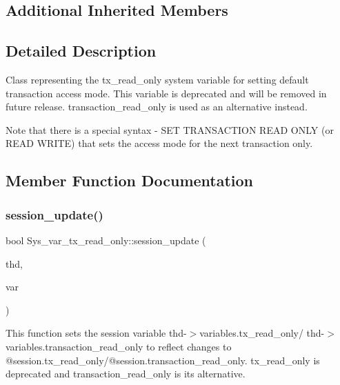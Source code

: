 \subsection*{Additional Inherited Members}


\subsection{Detailed Description}
Class representing the tx\+\_\+read\+\_\+only system variable for setting default transaction access mode. This variable is deprecated and will be removed in future release. \textquotesingle{}transaction\+\_\+read\+\_\+only\textquotesingle{} is used as an alternative instead.

Note that there is a special syntax -\/ S\+ET T\+R\+A\+N\+S\+A\+C\+T\+I\+ON R\+E\+AD O\+N\+LY (or R\+E\+AD W\+R\+I\+TE) that sets the access mode for the next transaction only. 

\subsection{Member Function Documentation}
\mbox{\label{classSys__var__tx__read__only_a449265a5bbe337c98f35529132f9482b}} 
\subsubsection{\texorpdfstring{session\+\_\+update()}{session\_update()}}
{\footnotesize\ttfamily bool Sys\+\_\+var\+\_\+tx\+\_\+read\+\_\+only\+::session\+\_\+update (\begin{DoxyParamCaption}\item[{T\+HD $\ast$}]{thd,  }\item[{\mbox{\hyperlink{classset__var}{set\+\_\+var}} $\ast$}]{var }\end{DoxyParamCaption})\hspace{0.3cm}{\ttfamily [virtual]}}

This function sets the session variable thd-\/$>$variables.\+tx\+\_\+read\+\_\+only/ thd-\/$>$variables.\+transaction\+\_\+read\+\_\+only to reflect changes to @session.\+tx\+\_\+read\+\_\+only/@session.\+transaction\+\_\+read\+\_\+only. \textquotesingle{}tx\+\_\+read\+\_\+only\textquotesingle{} is deprecated and \textquotesingle{}transaction\+\_\+read\+\_\+only\textquotesingle{} is its alternative.


